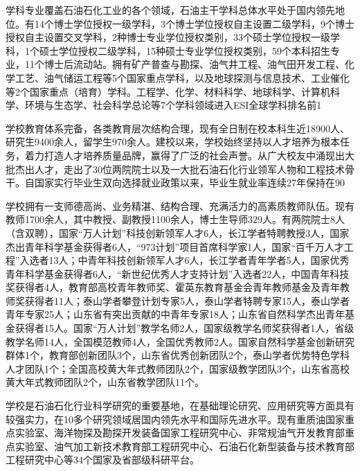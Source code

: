 \documentclass{article}
\begin{document}
\begin{itemize}
学科专业覆盖石油石化工业的各个领域，石油主干学科总体水平处于国内领先地位。有14个博士学位授权一级学科，3个博士学位授权自主设置二级学科，9个博士授权自主设置交叉学科，2种博士专业学位授权类别，33个硕士学位授权一级学科，1个硕士学位授权二级学科，15种硕士专业学位授权类别，59个本科招生专业，11个博士后流动站。拥有矿产普查与勘探、油气井工程、油气田开发工程、化学工艺、油气储运工程等5个国家重点学科，以及地球探测与信息技术、工业催化等2个国家重点（培育）学科。工程学、化学、材料科学、地球科学、计算机科学、环境与生态学、社会科学总论等7个学科领域进入ESI全球学科排名前1%

学校教育体系完备，各类教育层次结构合理，现有全日制在校本科生近18900人、研究生9400余人，留学生970余人。建校以来，学校始终坚持以人才培养为根本任务，着力打造人才培养质量品牌，赢得了广泛的社会声誉。从广大校友中涌现出大批杰出人才，走出了30位两院院士以及一大批石油石化行业领军人物和工程技术骨干。自国家实行毕业生双向选择就业政策以来，毕业生就业率连续27年保持在90%

学校拥有一支师德高尚、业务精湛、结构合理、充满活力的高素质教师队伍。现有教师1700余人，其中教授、副教授1100余人，博士生导师329人。有两院院士8人（含双聘），国家“万人计划”科技创新领军人才6人，长江学者特聘教授3人，国家杰出青年科学基金获得者6人，“973计划”项目首席科学家1人，国家“百千万人才工程”入选者13人；中青年科技创新领军人才6人，长江学者青年学者5人，国家优秀青年科学基金获得者6人，“新世纪优秀人才支持计划”入选者22人，中国青年科技奖获得者4人，教育部高校青年教师奖、霍英东教育基金会青年教师基金及青年教师奖获得者11人；泰山学者攀登计划专家5人，泰山学者特聘专家15人，泰山学者青年专家25人；山东省有突出贡献的中青年专家18人；山东省自然科学杰出青年基金获得者15人。国家“万人计划”教学名师2人，国家级教学名师奖获得者1人，省级教学名师14人，全国模范教师4人，全国优秀教师2人。国家自然科学基金创新研究群体1个，教育部创新团队3个，山东省优秀创新团队2个，泰山学者优势特色学科人才团队1个；全国高校黄大年式教师团队2个，国家级教学团队3个，山东省高校黄大年式教师团队2个，山东省教学团队11个。

学校是石油石化行业科学研究的重要基地，在基础理论研究、应用研究等方面具有较强实力，在10多个研究领域居国内领先水平和国际先进水平。现有重质油国家重点实验室、海洋物探及勘探开发装备国家工程研究中心、非常规油气开发教育部重点实验室、油气加工新技术教育部工程研究中心、石油石化新型装备与技术教育部工程研究中心等34个国家及省部级科研平台。


\end{itemize}
\end{document}
